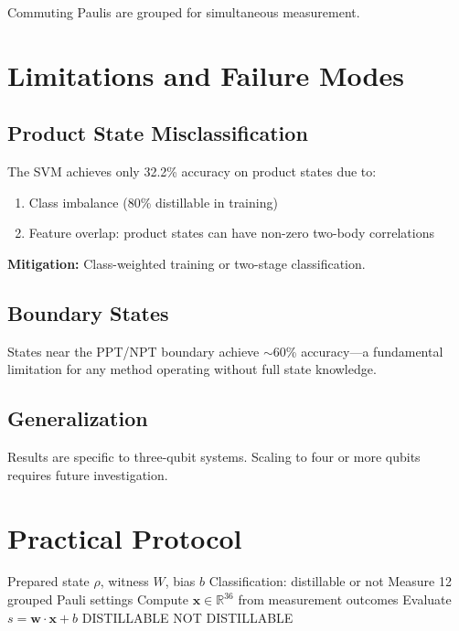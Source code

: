\documentclass[11pt,a4paper]{article}
\newcommand{\R}{\mathbb{R}}
\begin{document}
Commuting Paulis are grouped for simultaneous measurement.

\section{Limitations and Failure Modes}

\subsection{Product State Misclassification}

The SVM achieves only 32.2\% accuracy on product states due to:
\begin{enumerate}[noitemsep]
    \item Class imbalance (80\% distillable in training)
    \item Feature overlap: product states can have non-zero two-body correlations
\end{enumerate}

\textbf{Mitigation:} Class-weighted training or two-stage classification.

\subsection{Boundary States}

States near the PPT/NPT boundary achieve $\sim$60\% accuracy---a fundamental limitation for any method operating without full state knowledge.

\subsection{Generalization}

Results are specific to three-qubit systems. Scaling to four or more qubits requires future investigation.

\section{Practical Protocol}

\begin{algorithm}
\caption{Real-time distillability verification}
\begin{algorithmic}[1]
\Require Prepared state $\rho$, witness $W$, bias $b$
\Ensure Classification: distillable or not
\State Measure 12 grouped Pauli settings
\State Compute $\mathbf{x} \in \R^{36}$ from measurement outcomes
\State Evaluate $s = \mathbf{w} \cdot \mathbf{x} + b$
    \State \Return DISTILLABLE
\Else
    \State \Return NOT DISTILLABLE
\EndIf
\end{algorithmic}
\end{algorithm}
\end{document}

